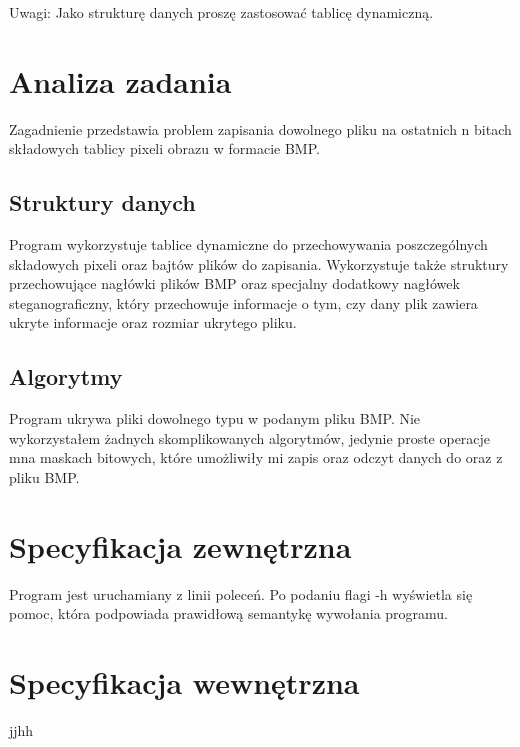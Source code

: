 \documentclass[12pt,a4paper,twoside]{article}
\begin{document}
Uwagi:  Jako strukturę danych proszę zastosować tablicę dynamiczną. 
\section{Analiza zadania}

Zagadnienie przedstawia problem zapisania dowolnego pliku na ostatnich n bitach składowych tablicy pixeli obrazu w formacie BMP.

\subsection{Struktury danych}
Program wykorzystuje tablice dynamiczne do przechowywania poszczególnych składowych pixeli oraz bajtów plików do zapisania. Wykorzystuje także struktury przechowujące
nagłówki plików BMP oraz specjalny dodatkowy nagłówek steganograficzny, który przechowuje informacje o tym, czy dany plik zawiera ukryte informacje oraz rozmiar ukrytego pliku.

\subsection{Algorytmy}
Program ukrywa pliki dowolnego typu w podanym pliku BMP. Nie wykorzystałem żadnych skomplikowanych algorytmów, jedynie proste operacje mna maskach bitowych, które
umożliwiły mi zapis oraz odczyt danych do oraz z pliku BMP. 

\section{Specyfikacja zewnętrzna}
\label{sec:sp:zewnetrzna}
Program jest uruchamiany z linii poleceń. Po podaniu flagi -h wyświetla się pomoc, która podpowiada prawidłową semantykę wywołania programu.



\section{Specyfikacja wewnętrzna}\label{sec:sp-wew}
jjhh
 
\end{document}
